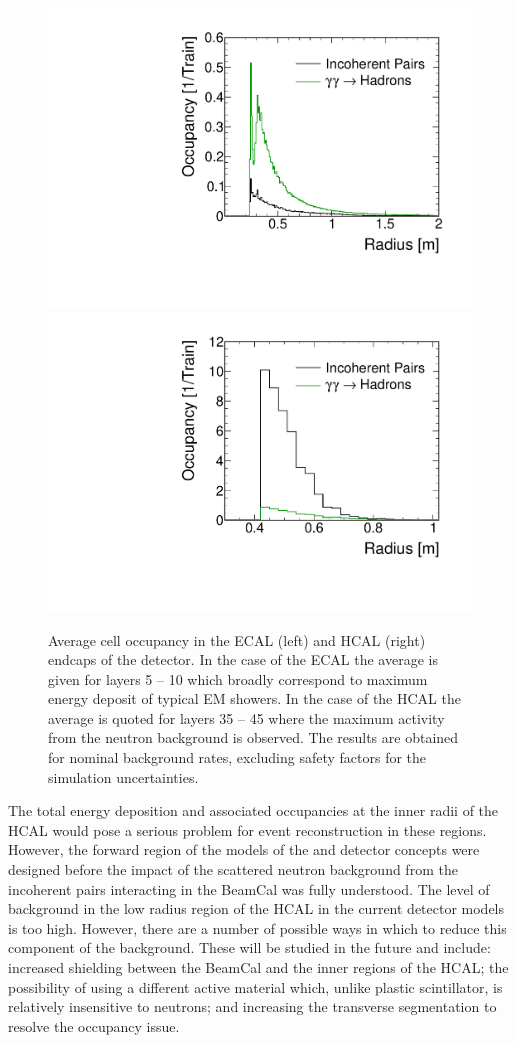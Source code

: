 \begin{figure}[hbt]
\centering
\includegraphics[width=0.49\linewidth]{../Chap3_ExpCond_PhysPerfsReqs/ECalRadiusGandPMacro.pdf}
\includegraphics[width=0.49\linewidth]{../Chap3_ExpCond_PhysPerfsReqs/HCalRadiusGandPMacro.pdf}
 \caption{Average cell occupancy in the ECAL (left) and HCAL (right) endcaps of the \clicild detector. In the case of the ECAL 
 the average is given for layers 5 -- 10 which broadly correspond to maximum energy deposit of typical
 EM showers. In the case of the HCAL the average is quoted for layers 35 -- 45 where the maximum activity
 from the neutron background is observed. The results are obtained for nominal background
 rates, excluding safety factors for the simulation uncertainties.
  \label{fig:chap3:caloBackOccupancy}}

\end{figure}

The total energy deposition and associated occupancies at the inner radii of the
HCAL would pose a serious problem for event reconstruction in these regions.
However, the forward region of the \geant models of the \clicild and \clicsid
detector concepts were designed before the impact of the scattered neutron
background from the incoherent pairs interacting in the BeamCal was fully understood.
The level of background in the low radius region of the HCAL in the current
detector models is too high. However, there are a number of possible ways in which
to reduce this component of the background. These will be studied in the future and include: increased shielding
between the BeamCal and the inner regions of the HCAL; the possibility
of using a different active material which, unlike plastic scintillator, is relatively
insensitive to neutrons; and increasing the transverse segmentation to resolve
the occupancy issue. 

